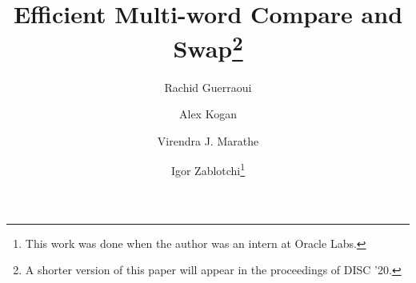 \documentclass[a4paper,USenglish]{lipics-v2019}
\title{Efficient Multi-word Compare and Swap\footnote{A shorter version of this paper will appear in the proceedings of DISC '20.}} %
\author{Rachid Guerraoui}{EPFL, Switzerland}{rachid.guerraoui@epfl.ch}{}{}%
\author{Alex Kogan}{Oracle Labs, USA}{alex.kogan@oracle.com}{}{}
\author{Virendra J. Marathe}{Oracle Labs, USA}{virendra.marathe@oracle.com}{}{}
\author{Igor Zablotchi\footnote{This work was done when the author was an intern at Oracle Labs.}}{EPFL, Switzerland}{igor.zablotchi@epfl.ch}{}{}
\begin{document}
\maketitle












\begin{camera}
\end{camera}\begin{arxiv}
\appendix

\end{arxiv}
\end{document}
